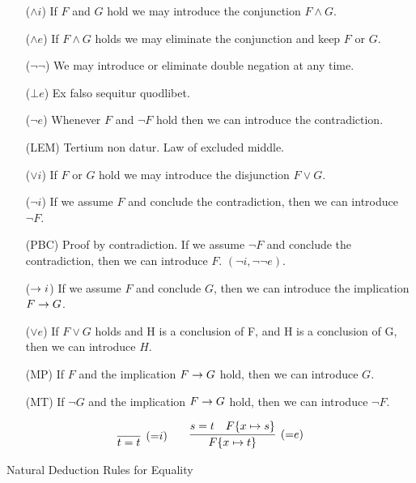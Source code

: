 \begin{itemize}
	\item[($\land i$)] If $F$ and $G$ hold we may introduce the conjunction $F\land G$.
	\item[($\land e$)] If $F \land G$ holds we may eliminate the conjunction and keep $F$ or $G$.
	\item[($\lnot\lnot$)] We may introduce or eliminate double negation at any time.
	\item[($\bot e$)] Ex falso sequitur quodlibet. 
	\item[($\lnot e$)] Whenever $F$ and $\lnot F$ hold then we can introduce the contradiction.
	\item[(LEM)] Tertium non datur. Law of excluded middle.
	\item[($\lor i$)] If $F$ or $G$ hold we may introduce the disjunction $F\lor G$.
	\item[($\lnot i$)] If we assume $F$ and conclude the contradiction, then we can introduce $\lnot F$.
	\item[(PBC)] Proof by contradiction. If we assume $\lnot F$ and conclude the contradiction, then we can introduce $F$.
	$(\lnot i,\lnot\lnot e)$. 
	\item[($\rightarrow i$)] If we assume $F$ and conclude $G$, then we can introduce the implication $F\rightarrow G$.
	\item[($\lor e$)] If $F\lor G$ holds and H is a conclusion of F, and H is a conclusion of G, then we can introduce $H$.
	\item[(MP)] If $F$ and the implication $F\rightarrow G$ hold, then we can introduce $G$.
	\item[(MT)] If $\lnot G$ and the implication $F\rightarrow G$ hold, then we can introduce $\lnot F$.
\end{itemize}

\begin{table}[hbt]
	\begin{gather*}
	\infer[({=}i)]{t=t}{}
	\qquad
	\infer[({=}e)]{F\{x\mapsto t\}}{s=t & F\{x\mapsto s\}}
	\end{gather*}
	\caption{Natural Deduction Rules for Equality}
	\label{tab:natural:deduction:equality}
\end{table}

